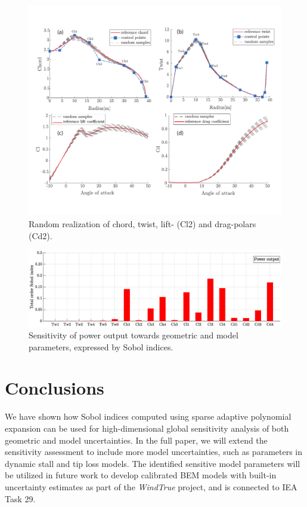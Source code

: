 \documentclass[11pt]{article}
\begin{document}
\begin{figure}[h!]
 \centering
 \includegraphics[trim={0 1.6cm 0 1.5cm},clip, scale=0.7]{figure1.pdf}
 \caption{Random realization of chord, twist, lift- (Cl2) and drag-polars (Cd2).}
 \label{fig:samples}
\end{figure}

\begin{figure}[h!]
 \centering
  \includegraphics[width=\linewidth]{SA_Power_chord_twist_Cl_Cd.eps}
 \caption{Sensitivity of power output towards geometric and model parameters, expressed by Sobol indices.}
  \label{fig:Sobol}
\end{figure}
\section{Conclusions}
We have shown how Sobol indices computed using sparse adaptive polynomial expansion can be used for high-dimensional global sensitivity analysis of both geometric and model uncertainties. In the full paper, we will extend the sensitivity assessment to include more model uncertainties, such as parameters in dynamic stall and tip loss models. The identified sensitive model parameters will be utilized in future work to develop calibrated BEM models with built-in uncertainty estimates as part of the \textit{WindTrue} project, and is connected to IEA Task 29.



\end{document}
